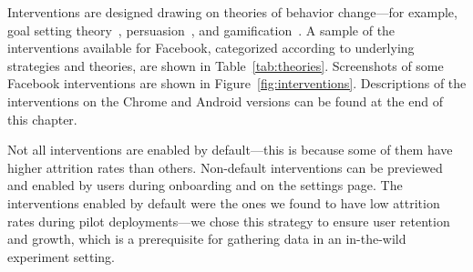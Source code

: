 Interventions are designed drawing on theories of behavior change---for example, goal setting theory~\cite{locke2002building}, persuasion~\cite{cialdini1987influence,fogg2002persuasive,abraham2008taxonomy}, and gamification~\cite{deterding2011game}. A sample of the interventions available for Facebook, categorized according to underlying strategies and theories, are shown in Table~\ref{tab:theories}. Screenshots of some Facebook interventions are shown in Figure~\ref{fig:interventions}.  Descriptions of the interventions on the Chrome and Android versions can be found at the end of this chapter. %


Not all interventions are enabled by default---this is because some of them have higher attrition rates than others. Non-default interventions can be previewed and enabled by users during onboarding and on the settings page. The interventions enabled by default were the ones we found to have low attrition rates during pilot deployments---we chose this strategy to ensure user retention and growth, which is a prerequisite for gathering data in an in-the-wild experiment setting.

